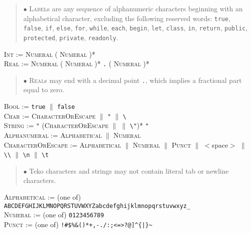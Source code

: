 \documentclass{article}
\newcommand{\code}[1]{\colorbox{light-gray}{\texttt{#1}}}
\begin{document}
\begin{quote} $\bullet$ \textsc{Label}s are any sequence of alphanumeric characters beginning with an alphabetical character, excluding the following reserved words: \code{true}, \code{false}, \code{if}, \code{else}, \code{for}, \code{while}, \code{each}, \code{begin}, \code{let}, \code{class}, \code{in}, \code{return}, \code{public}, \code{protected}, \code{private}, \code{readonly}. \end{quote}

\textsc{Int} := \textsc{Numeral} ( \textsc{Numeral} )* \\

\textsc{Real} := \textsc{Numeral} ( \textsc{Numeral} )* \code{.} ( \textsc{Numeral} )* 

\begin{quote} $\bullet$ \textsc{Real}s may end with a decimal point \code{.}, which implies a fractional part equal to zero. \end{quote}

\textsc{Bool} := \code{true} $\|$ \code{false} \\

\textsc{Char} := \code{} \textsc{CharacterOrEscape} \code{} $\|$ \code{\char13"} $\|$ \code{\char13\textbackslash\char13\char13} \\

\textsc{String} := \code{"} (\textsc{CharacterOrEscape} $\|$ \code{} $\|$ \code{\textbackslash"})* \code{"} \\

\textsc{Alphanumeral} := \textsc{Alphabetical} $\|$ \textsc{Numeral} \\

\textsc{CharacterOrEscape} := \textsc{Alphabetical} $\|$ \textsc{Numeral} $\|$ \textsc{Punct} $\|$ $<$space$>$ $\|$ \code{\textbackslash\textbackslash} $\|$ \code{\textbackslash n} $\|$ \code{\textbackslash t} 

\begin{quote} $\bullet$ Teko characters and strings may not contain literal tab or newline characters. \end{quote}

\textsc{Alphabetical} := (one of) \code{ABCDEFGHIJKLMNOPQRSTUVWXYZabcdefghijklmnopqrstuvwxyz\_} \\

\textsc{Numeral} := (one of) \code{0123456789} \\

\textsc{Punct} := (one of) \code{!\#\$\%\&()*+,-./:;<=>?@]\^{}\{|\}\~} \\
\end{document}
